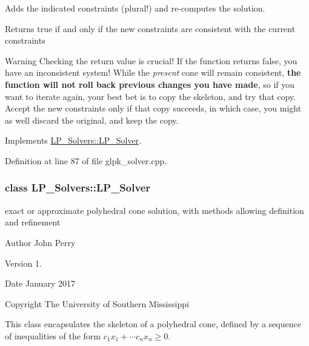 Adds the indicated constraints (plural!) and re-\/computes the solution. 

\begin{DoxyReturn}{Returns}
{\ttfamily true} if and only if the new constraints are consistent with the current constraints
\end{DoxyReturn}
\begin{DoxyWarning}{Warning}
Checking the return value is crucial! If the function returns {\ttfamily false}, you have an inconsistent system! While the {\itshape present} cone will remain consistent, {\bfseries the function will not roll back previous changes you have made}, so if you want to iterate again, your best bet is to copy the skeleton, and try that copy. Accept the new constraints only if that copy succeeds, in which case, you might as well discard the original, and keep the copy. 
\end{DoxyWarning}


Implements \hyperlink{group___c_l_s_solvers_aea1a5bf98a2c4c06b0550cacdf8b88fd}{L\+P\+\_\+\+Solvers\+::\+L\+P\+\_\+\+Solver}.



Definition at line 87 of file glpk\+\_\+solver.\+cpp.

\label{class_l_p___solvers_1_1_l_p___solver}
\subsubsection{class L\+P\+\_\+\+Solvers\+:\+:L\+P\+\_\+\+Solver}
exact or approximate polyhedral cone solution, with methods allowing definition and refinement 

\begin{DoxyAuthor}{Author}
John Perry 
\end{DoxyAuthor}
\begin{DoxyVersion}{Version}
1. 
\end{DoxyVersion}
\begin{DoxyDate}{Date}
January 2017 
\end{DoxyDate}
\begin{DoxyCopyright}{Copyright}
The University of Southern Mississippi
\end{DoxyCopyright}
This class encapsulates the skeleton of a polyhedral cone, defined by a sequence of inequalities of the form $ c_1 x_1 + \cdots c_n x_n \geq 0 $.

